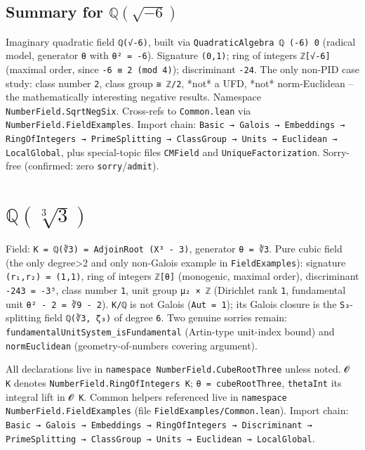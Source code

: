 \documentclass[UTF8,a4paper,11pt,fontset=fandol]{ctexart}
\theoremstyle{definition}
\begin{document}
\subsection{Summary for \(\mathbb Q(\sqrt{-6})\)}

Imaginary quadratic field \texttt{ℚ(√-6)}, built via \texttt{QuadraticAlgebra ℚ (-6) 0} (radical model, generator \texttt{θ} with \texttt{θ² = -6}). Signature \texttt{(0,1)}; ring of integers \texttt{ℤ[√-6]} (maximal order, since \texttt{-6 ≡ 2 (mod 4)}); discriminant \texttt{-24}. The only non-PID case study: class number \texttt{2}, class group \texttt{≅ ℤ/\allowbreak{}2}, *not* a UFD, *not* norm-Euclidean -- the mathematically interesting negative results. Namespace \texttt{NumberField.\allowbreak{}SqrtNegSix}. Cross-refs to \texttt{Common.\allowbreak{}lean} via \texttt{NumberField.\allowbreak{}FieldExamples}. Import chain: \texttt{Basic → Galois → Embeddings → RingOfIntegers → PrimeSplitting → ClassGroup → Units → Euclidean → LocalGlobal}, plus special-topic files \texttt{CMField} and \texttt{UniqueFactorization}. Sorry-free (confirmed: zero \texttt{sorry}/\texttt{admit}).


\section{\(\mathbb Q(\sqrt[3]{3})\)}

Field: \texttt{K = ℚ(∛3) = AdjoinRoot (X³ - 3)}, generator \texttt{θ = ∛3}. Pure cubic field (the only degree>2 and only non-Galois example in \texttt{FieldExamples}): signature \texttt{(r₁,r₂) = (1,1)}, ring of integers \texttt{ℤ[θ]} (monogenic, maximal order), discriminant \texttt{-243 = -3⁵}, class number \texttt{1}, unit group \texttt{μ₂ × ℤ} (Dirichlet rank \texttt{1}, fundamental unit \texttt{θ² - 2 = ∛9 - 2}). \texttt{K/\allowbreak{}ℚ} is not Galois (\texttt{Aut = 1}); its Galois closure is the \texttt{S₃}-splitting field \texttt{ℚ(∛3, ζ₃)} of degree \texttt{6}. Two genuine sorries remain: \texttt{fundamentalUnitSystem\_\allowbreak{}isFundamental} (Artin-type unit-index bound) and \texttt{normEuclidean} (geometry-of-numbers covering argument).

All declarations live in \texttt{namespace NumberField.\allowbreak{}CubeRootThree} unless noted. \texttt{𝓞 K} denotes \texttt{NumberField.\allowbreak{}RingOfIntegers K}; \texttt{θ = cubeRootThree}, \texttt{thetaInt} its integral lift in \texttt{𝓞 K}. Common helpers referenced live in \texttt{namespace NumberField.\allowbreak{}FieldExamples} (file \texttt{FieldExamples/\allowbreak{}Common.\allowbreak{}lean}). Import chain: \texttt{Basic → Galois → Embeddings → RingOfIntegers → Discriminant → PrimeSplitting → ClassGroup → Units → Euclidean → LocalGlobal}.
\end{document}
